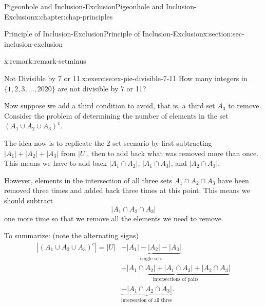 \documentclass[oneside,10pt,]{book}
\numberwithin{equation}{section}
\newcommand{\amp}{&}
\begin{document}
\begin{chapterptx}{Pigeonhole and Inclusion-Exclusion}{}{Pigeonhole and Inclusion-Exclusion}{}{}{x:chapter:chap-principles}
\begin{sectionptx}{Principle of Inclusion-Exclusion}{}{Principle of Inclusion-Exclusion}{}{}{x:section:sec-inclusion-exclusion}
\begin{remark}{}{x:remark:remark-setminus}
\end{remark}
\begin{inlineexercise}{Not Divisible by 7 or 11.}{x:exercise:ex-pie-divisible-7-11}%
How many integers in \(\{1,2,3,\ldots,2020\}\) are not divisible by 7 or 11?%
\end{inlineexercise}%
Now suppose we add a third condition to avoid, that is, a third set \(A_3\) to remove. Consider the problem of determining the number of elements in the set \((A_1 \cup A_2 \cup A_3)^c\).%
\begin{sidebyside}{1}{0.325}{0.325}{0}%
\begin{sbspanel}{0.35}%
%
\end{sbspanel}%
\end{sidebyside}%
\par
The idea now is to replicate the 2-set scenario by first subtracting \(|A_1| + |A_2| + |A_3|\) from \(|U|\), then to add back what was removed more than once. This means we have to add back \(|A_1 \cap A_2|\), \(|A_1 \cap A_3|\), and \(|A_2 \cap A_3|\).%
\par
However, elements in the intersection of all three sets \(A_1 \cap A_2 \cap A_3\) have been removed three times and added back three times at this point. This means we should subtract%
\begin{equation*}
|A_1 \cap A_2 \cap A_3|
\end{equation*}
one more time so that we remove all the elements we need to remove.%
\par
To summarize: (note the alternating signs)%
\begin{align*}
|(A_1 \cup A_2 \cup A_3)^c| = |U| \amp \underbrace{- |A_1| - |A_2| - |A_3|}_{\text{single sets}} \\
\amp \underbrace{+ |A_1 \cap A_2| + |A_1 \cap A_3| + |A_2 \cap A_3|}_{\text{intersections of pairs}}\\
\amp \underbrace{- |A_1 \cap A_2 \cap A_3|}_{\text{intersection of all three}}\text{.}
\end{align*}

\end{sectionptx}
\end{chapterptx}
\end{document}
